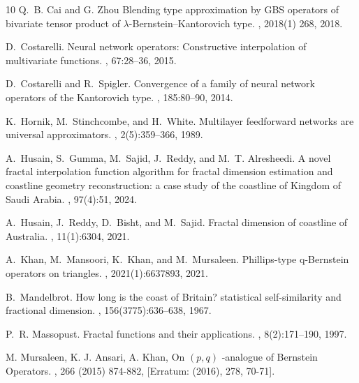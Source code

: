 \documentclass{article}[12pt, a4]
\begin{document}
\begin{thebibliography}{10}
			Q.~B. Cai and G. Zhou 
			\newblock Blending type approximation by {GBS} operators of bivariate tensor
			product of $\lambda$-{B}ernstein--{K}antorovich type.
			, 2018(1) 268, 2018.
			
			D.~Costarelli.
			\newblock Neural network operators: Constructive interpolation of multivariate
			functions.
			, 67:28--36, 2015.
			
			D.~Costarelli and R.~Spigler.
			\newblock Convergence of a family of neural network operators of the
			{K}antorovich type.
			, 185:80--90, 2014.
			
			K.~Hornik, M.~Stinchcombe, and H.~White.
			\newblock Multilayer feedforward networks are universal approximators.
			, 2(5):359--366, 1989.
			
			A.~Husain, S.~Gumma, M.~Sajid, J.~Reddy, and M.~T. Alresheedi.
			\newblock A novel fractal interpolation function algorithm for fractal
			dimension estimation and coastline geometry reconstruction: a case study of
			the coastline of {K}ingdom of {S}audi {A}rabia.
			, 97(4):51, 2024.
			
			A.~Husain, J.~Reddy, D.~Bisht, and M.~Sajid.
			\newblock Fractal dimension of coastline of {A}ustralia.
			, 11(1):6304, 2021.
			
			A.~Khan, M.~Mansoori, K.~Khan, and M.~Mursaleen.
			\newblock Phillips-type q-{B}ernstein operators on triangles.
			, 2021(1):6637893, 2021.
			
			B.~Mandelbrot.
			\newblock How long is the coast of {B}ritain? statistical self-similarity and
			fractional dimension.
			, 156(3775):636--638, 1967.
			
			
			P.~R. Massopust.
			\newblock Fractal functions and their applications.
			, 8(2):171--190, 1997.
			
			
			M. Mursaleen, K. J. Ansari, A. Khan, On $(p,q)$%
			-analogue of Bernstein Operators.
			 , 266 (2015)
			874-882, [Erratum: (2016), 278, 70-71].
			

\end{thebibliography}
\end{document}

